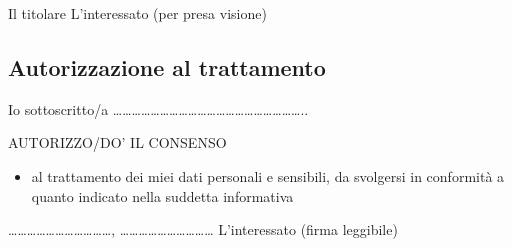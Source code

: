 Il titolare \flushright L’interessato (per presa visione)

\subsection*{Autorizzazione al trattamento}
Io sottoscritto/a ……………………………………………………..
\begin{center}
AUTORIZZO/DO’ IL CONSENSO
\end{center}
\begin{itemize}[label=$\square$]
    \item al trattamento dei miei dati personali e sensibili, da svolgersi in conformità a quanto indicato nella suddetta informativa
\end{itemize}

……………………………, …………………………
 L’interessato (firma leggibile)
